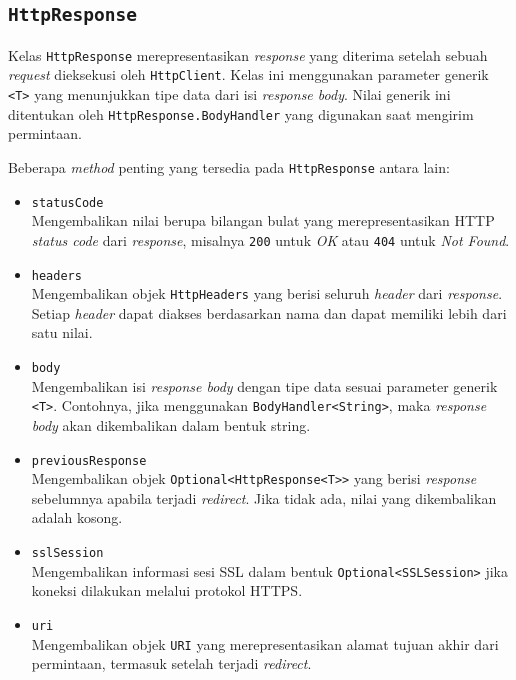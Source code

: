 \subsection{\texttt{HttpResponse}}
\label{subsec:0228-httpresponse}

Kelas \texttt{HttpResponse} merepresentasikan \textit{response} yang diterima setelah sebuah \textit{request} dieksekusi oleh \texttt{HttpClient}. Kelas ini menggunakan parameter generik \texttt{<T>} yang menunjukkan tipe data dari isi \textit{response body}. Nilai generik ini ditentukan oleh \texttt{HttpResponse.BodyHandler} yang digunakan saat mengirim permintaan.

Beberapa \textit{method} penting yang tersedia pada \texttt{HttpResponse} antara lain:

\begin{itemize}
    \item \texttt{statusCode}\\
    Mengembalikan nilai berupa bilangan bulat yang merepresentasikan HTTP \textit{status code} dari \textit{response}, misalnya \texttt{200} untuk \textit{OK} atau \texttt{404} untuk \textit{Not Found}.
    
    \item \texttt{headers}\\
    Mengembalikan objek \texttt{HttpHeaders} yang berisi seluruh \textit{header} dari \textit{response}. Setiap \textit{header} dapat diakses berdasarkan nama dan dapat memiliki lebih dari satu nilai.
    
    \item \texttt{body}\\
    Mengembalikan isi \textit{response body} dengan tipe data sesuai parameter generik \texttt{<T>}. Contohnya, jika menggunakan \texttt{BodyHandler<String>}, maka \textit{response body} akan dikembalikan dalam bentuk string.
    
    \item \texttt{previousResponse}\\
    Mengembalikan objek \texttt{Optional<HttpResponse<T>>} yang berisi \textit{response} sebelumnya apabila terjadi \textit{redirect}. Jika tidak ada, nilai yang dikembalikan adalah kosong.
    
    \item \texttt{sslSession}\\
    Mengembalikan informasi sesi SSL dalam bentuk \texttt{Optional<SSLSession>} jika koneksi dilakukan melalui protokol HTTPS.
    
    \item \texttt{uri}\\
    Mengembalikan objek \texttt{URI} yang merepresentasikan alamat tujuan akhir dari permintaan, termasuk setelah terjadi \textit{redirect}.
    

\end{itemize}
